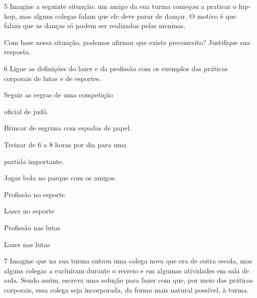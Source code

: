 

\num{5} Imagine a seguinte situação: um amigo da sua turma começou a praticar
  o hip-hop, mas alguns colegas falam que ele deve parar de dançar. O
  motivo é que falam que as danças só podem ser realizadas pelas
  meninas.

Com base nessa situação, podemos afirmar que existe preconceito?
Justifique sua resposta.



\num{6} Ligue as definições do lazer e da profissão com os exemplos das
  práticas corporais de lutas e de esportes.

\begin{multicols}{2}
Seguir as regras de uma competição

oficial de judô.\medskip

Brincar de esgrima com espadas de papel.\medskip

Treinar de 6 a 8 horas por dia para uma

partida importante. \medskip

Jogar bola no parque com os amigos.

\columnbreak

Profissão no esporte \medskip

Lazer no esporte \medskip

Profissão nas lutas \medskip

Lazer nas lutas
\end{multicols}



\num{7} Imagine que na sua turma entrou uma colega nova que era de outra escola, mas
  alguns colegas a excluíram durante o recreio e em algumas
  atividades em sala de aula. Sendo assim, escreva uma solução para fazer com
  que, por meio das práticas corporais, essa colega seja incorporada, da forma mais natural possível, à turma.

